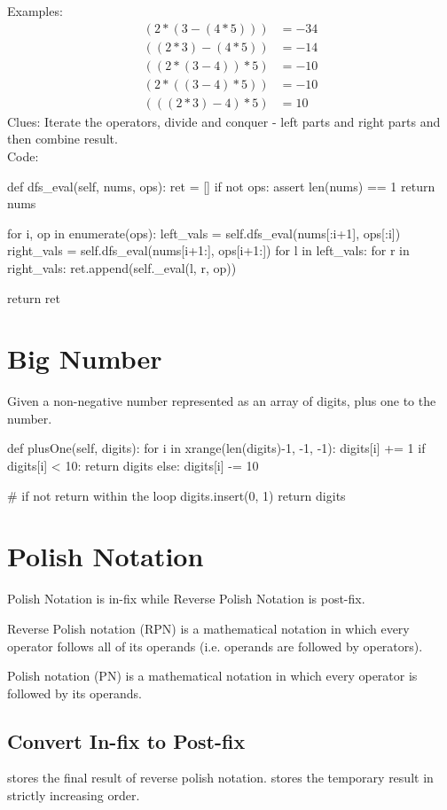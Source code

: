 Examples:
\begin{align*}
(2*(3-(4*5))) &= -34 \\
((2*3)-(4*5)) &= -14 \\
((2*(3-4))*5) &= -10 \\
(2*((3-4)*5)) &= -10 \\
(((2*3)-4)*5) &= 10
\end{align*}
Clues: Iterate the operators, divide and conquer - left parts and right parts and then combine result. \\
Code:
\begin{python}
def dfs_eval(self, nums, ops):
    ret = []
    if not ops:
        assert len(nums) == 1
        return nums

    for i, op in enumerate(ops):
        left_vals = self.dfs_eval(nums[:i+1], ops[:i])
        right_vals = self.dfs_eval(nums[i+1:], ops[i+1:])
        for l in left_vals:
            for r in right_vals:
                ret.append(self._eval(l, r, op))

    return ret
\end{python}

\section{Big Number}
 Given a non-negative number represented as an array of digits, plus one to the number.
\begin{python}
def plusOne(self, digits):
    for i in xrange(len(digits)-1, -1, -1):
        digits[i] += 1
        if digits[i] < 10:
            return digits
        else:
            digits[i] -= 10

    # if not return within the loop 
    digits.insert(0, 1)
    return digits
\end{python}

\section{Polish Notation}
Polish Notation is in-fix while Reverse Polish Notation is post-fix. 

Reverse Polish notation (RPN) is a mathematical notation in which every operator follows all of its operands (i.e. operands are followed by operators).

Polish notation (PN) is a mathematical notation in which every operator is followed by its operands. 

\subsection{Convert In-fix to Post-fix}
 stores the final result of reverse polish notation.  stores
the temporary result in strictly increasing order. 

